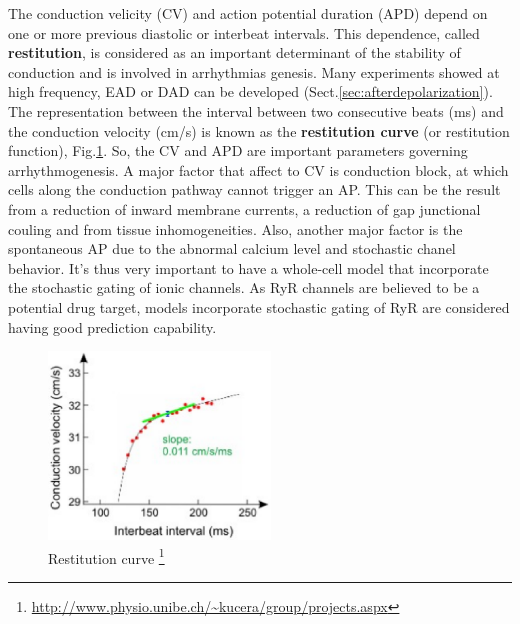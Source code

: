 The conduction velicity (CV) and action potential duration (APD) depend on
one or more previous diastolic or interbeat intervals. This dependence, called
{\bf restitution}, is considered as an important determinant of the stability of
conduction and is involved in arrhythmias genesis. Many experiments showed
at high frequency, EAD or DAD can be developed
(Sect.\ref{sec:afterdepolarization}). The representation between the interval
between two consecutive beats (ms) and the conduction velocity (cm/s) is known
as the {\bf restitution curve} (or restitution function),
Fig.\ref{fig:restitution_curve}. So, the CV and APD are important parameters
governing arrhythmogenesis. A major factor that affect to CV is conduction
block, at which cells along the conduction pathway cannot trigger an AP.
This can be the result from a reduction of inward membrane currents, a reduction
of gap junctional couling and from tissue inhomogeneities. Also, another major
factor is the spontaneous AP due to the abnormal calcium level and stochastic
chanel behavior. It's thus very important to have a whole-cell model that
incorporate the stochastic gating of ionic channels. As RyR channels are
believed to be a potential drug target, models incorporate stochastic gating of
RyR are considered having good prediction capability.


\begin{figure}[hbt]
  \centerline{\includegraphics[height=5cm,
    angle=0]{./images/restitution_curve.eps}}
  \caption{Restitution curve
  \footnote{\url{http://www.physio.unibe.ch/~kucera/group/projects.aspx}}}
  \label{fig:restitution_curve}
\end{figure}


